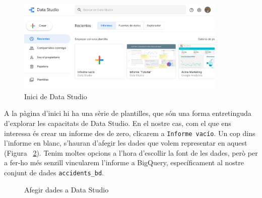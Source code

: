 \documentclass[11pt,longbibliography]{article}
\theoremstyle{definition}
\theoremstyle{remark}
\begin{document}
\begin{figure}[h!]
\begin{center}
\includegraphics[width=10cm]{ds1}
\end{center}
\caption{Inici de Data Studio}
\label{fig:ds1}
\end{figure}

A la pàgina d’inici hi ha una sèrie de plantilles, que són una forma entretinguda d’explorar les capacitats de Data Studio. En el nostre cas, com el que ens interessa és crear un informe des de zero, clicarem a \verb|Informe vacío|. Un cop dins l’informe en blanc, s’hauran d’afegir les dades que volem representar en aquest (Figura ~\ref{fig:ds2}). Tenim moltes opcions a l'hora d'escollir la font de les dades, però per a fer-ho més senzill vincularem l'informe a BigQuery, específicament al nostre conjunt de dades \verb|accidents_bd|.


\begin{figure}[h!]
\par
{}%
\hfill
{}%
\par

\caption{Afegir dades a Data Studio}
\label{fig:ds2}
\end{figure}
\end{document}
